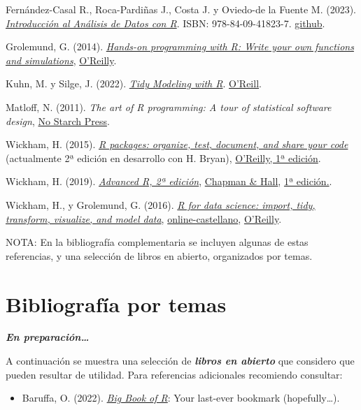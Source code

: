 \documentclass[
]{book}
\providecommand{\tightlist}{%
  \setlength{\itemsep}{0pt}\setlength{\parskip}{0pt}}
\theoremstyle{break}
\theoremstyle{nonumberplain}
\begin{document}
Fernández-Casal R., Roca-Pardiñas J., Costa J. y Oviedo-de la Fuente M. (2023). \emph{\href{https://rubenfcasal.github.io/intror}{Introducción al Análisis de Datos con R}}. ISBN: 978-84-09-41823-7. \href{https://github.com/rubenfcasal/intror}{github}.

Grolemund, G. (2014). \emph{\href{https://rstudio-education.github.io/hopr}{Hands-on programming with R: Write your own functions and simulations}}, \href{http://shop.oreilly.com/product/0636920028574.do}{O'Reilly}.

Kuhn, M. y Silge, J. (2022). \emph{\href{https://www.tmwr.org}{Tidy Modeling with R}}. \href{https://amzn.to/35Hn96s}{O'Reill}.

Matloff, N. (2011). \emph{The art of R programming: A tour of statistical software design}, \href{https://www.nostarch.com/artofr.htm}{No Starch Press}.

Wickham, H. (2015). \emph{\href{http://r-pkgs.had.co.nz/}{R packages: organize, test, document, and share your code}} (actualmente 2ª edición en desarrollo con H. Bryan), \href{http://shop.oreilly.com/product/0636920034421.do}{O'Reilly, 1ª edición}.

Wickham, H. (2019). \emph{\href{https://adv-r.hadley.nz/}{Advanced R, 2ª edición}}, \href{https://www.amazon.com/dp/0815384572}{Chapman \& Hall}, \href{http://adv-r.had.co.nz/}{1ª edición.}.

Wickham, H., y Grolemund, G. (2016). \emph{\href{http://r4ds.had.co.nz}{R for data science: import, tidy, transform, visualize, and model data}}, \href{https://es.r4ds.hadley.nz}{online-castellano}, \href{http://shop.oreilly.com/product/0636920034407.do}{O'Reilly}.

NOTA: En la bibliografía complementaria se incluyen algunas de estas referencias, y una selección de libros en abierto, organizados por temas.

\hypertarget{bibliografuxeda-por-temas}{%
\section*{Bibliografía por temas}\label{bibliografuxeda-por-temas}}

\textbf{\emph{En preparación\ldots{}}}

A continuación se muestra una selección de \textbf{\emph{libros en abierto}} que considero que pueden resultar de utilidad.
Para referencias adicionales recomiendo consultar:

\begin{itemize}
\tightlist
\item
  Baruffa, O. (2022). \emph{\href{https://www.bigbookofr.com}{Big Book of R}}: Your last-ever bookmark (hopefully\ldots).
\end{itemize}
\end{document}
